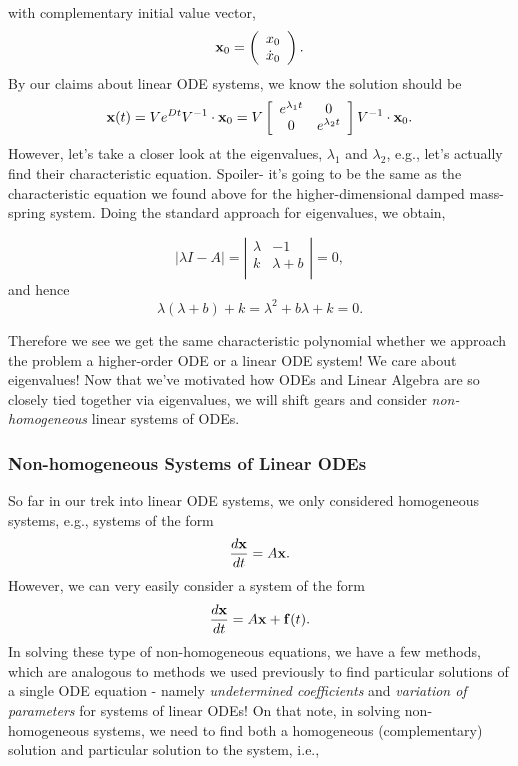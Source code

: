 \begin{itemize}
with complementary initial value vector, $${\bf{x}}_0 =  \left( \begin{array}{c} x_0 \\ \dot{x}_0   \\ \end{array} \right) .$$
%
By our claims about linear ODE systems, we know the solution should be $${\bf{x}}(t) = Ve^{Dt} V^{-1}\cdot {\bf{x}}_0  = V\left[ \begin{array}{cc} e^{\lambda_1 t} & 0 \\ 0 & e^{\lambda_2  t} \\ \end{array} \right] V^{-1} \cdot {\bf{x}}_0.$$
%
However, let's take a closer look at the eigenvalues, $\lambda_1$ and $\lambda_2$, e.g., let's actually find their characteristic equation. Spoiler- it's going to be the same as the characteristic equation we found above for the higher-dimensional damped mass-spring system. Doing the standard approach for eigenvalues, we obtain,

$$\Big|\lambda I - A\Big| = \left| \begin{array}{cc} \lambda & -1 \\ k &  \lambda+b \\ \end{array} \right| = 0,$$
%
and hence
$$\lambda(\lambda+b) + k = \lambda^2 + b\lambda + k = 0.$$
%
\end{itemize}
%
Therefore we see we get the same characteristic polynomial whether we approach the problem a higher-order ODE or a linear ODE system! We care about eigenvalues! Now that we've motivated how ODEs and Linear Algebra are so closely tied together via eigenvalues, we will shift gears and consider \emph{non-homogeneous} linear systems of ODEs.




%
%
%
%
\subsubsection{Non-homogeneous Systems of Linear ODEs}

So far in our trek into linear ODE systems, we only considered homogeneous systems, e.g., systems of the form $$\frac{d{\bf{x}}}{dt} = A{\bf{x}}.$$
%
However, we can very easily consider a system of the form $$\frac{d{\bf{x}}}{dt} = A{\bf{x}} + {\bf{f}}(t).$$
%
In solving these type of non-homogeneous equations, we have a few methods, which are analogous to methods we used previously to find particular solutions of a single ODE equation - namely \emph{undetermined coefficients} and \emph{variation of parameters} for systems of linear ODEs! On that note, in solving non-homogeneous systems, we need to find both a homogeneous (complementary) solution and particular solution to the system, i.e., 

